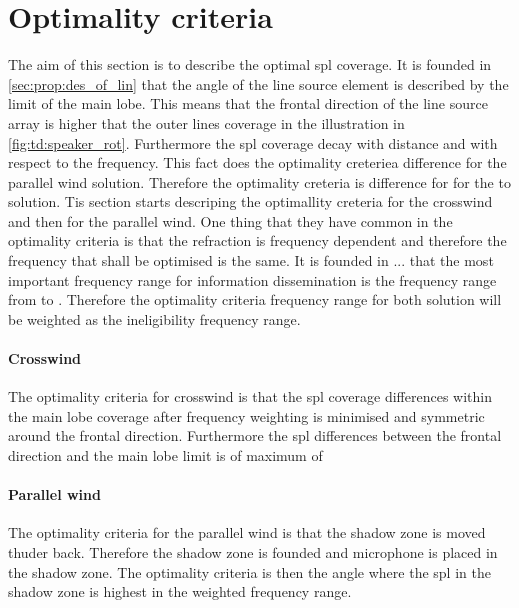 \section{Optimality criteria}
The aim of this section is to describe the optimal \gls{spl} coverage. It is founded in \autoref{sec:prop:des_of_lin} that the angle of the line source element is described by the  limit of the main lobe. This means that the frontal direction of the line source array is  higher that the outer lines coverage in the illustration in \autoref{fig:td:speaker_rot}. Furthermore the \gls{spl} coverage decay with distance and with respect to the frequency. This fact does the optimality creteriea difference for the parallel wind solution. Therefore the optimality creteria is difference for for the to solution. Tis section starts descriping the optimallity creteria for the crosswind and then for the parallel wind. One thing that they have common in the optimality criteria is that the refraction is frequency dependent and therefore the frequency that shall be optimised is the same. It is founded in ... that the most important frequency range for information dissemination is the frequency range from  to . Therefore the optimality criteria frequency range for both solution will be weighted as the ineligibility frequency range. 


\paragraph{Crosswind} The optimality criteria for crosswind is that the \gls{spl} coverage differences within the main lobe coverage after frequency weighting is minimised and symmetric around the frontal direction. Furthermore the \gls{spl} differences between the frontal direction and the main lobe limit is of maximum of 

\paragraph{Parallel wind} The optimality criteria for the parallel wind is that the shadow zone is moved thuder back. Therefore the shadow zone is founded and microphone is placed in the shadow zone. The optimality criteria is then the angle where the \gls{spl} in the shadow zone is highest in the weighted frequency range. 
